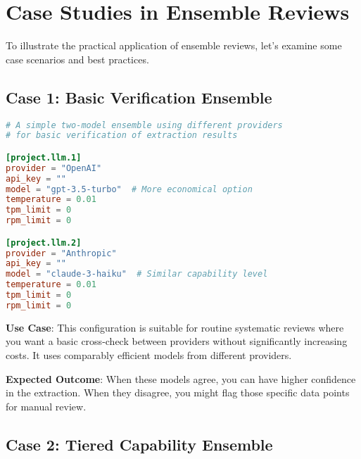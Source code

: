 
\section{Case Studies in Ensemble Reviews}

To illustrate the practical application of ensemble reviews, let's examine some case scenarios and best practices.

\subsection{Case 1: Basic Verification Ensemble}

\begin{configbox}
\begin{lstlisting}[language=TOML]
# A simple two-model ensemble using different providers
# for basic verification of extraction results

[project.llm.1]
provider = "OpenAI"
api_key = ""
model = "gpt-3.5-turbo"  # More economical option
temperature = 0.01
tpm_limit = 0
rpm_limit = 0

[project.llm.2]
provider = "Anthropic"
api_key = ""
model = "claude-3-haiku"  # Similar capability level
temperature = 0.01
tpm_limit = 0
rpm_limit = 0
\end{lstlisting}
\end{configbox}

\textbf{Use Case}: This configuration is suitable for routine systematic reviews where you want a basic cross-check between providers without significantly increasing costs. It uses comparably efficient models from different providers.

\textbf{Expected Outcome}: When these models agree, you can have higher confidence in the extraction. When they disagree, you might flag those specific data points for manual review.

\subsection{Case 2: Tiered Capability Ensemble}

